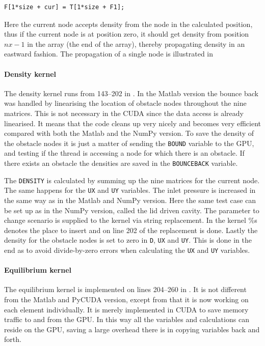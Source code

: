 \begin{verbatim}
F[1*size + cur] = T[1*size + F1];
\end{verbatim}

Here the current node accepts density from the node in the calculated position, thus if the current node is at position zero, it should get density from position $nx-1$ in the array (the end of the array), thereby propagating density in an eastward fashion. The propagation of a single node is illustrated in 


\paragraph{Density kernel}
The density kernel runs from 143--202 in . In the Matlab version the bounce back was handled by linearising the location of obstacle nodes throughout the nine matrices. This is not necessary in the CUDA since the data access is already linearised. It means that the code cleans up very nicely and becomes very efficient compared with both the Matlab and the NumPy version. To save the density of the obstacle nodes it is just a matter of sending the \texttt{BOUND} variable to the GPU, and testing if the thread is accessing a node for which there is an obstacle. If there exists an obstacle the densities are saved in the \texttt{BOUNCEBACK} variable.

The \texttt{DENSITY} is calculated by summing up the nine matrices for the current node. The same happens for the \texttt{UX} and \texttt{UY} variables. The inlet pressure is increased in the same way as in the Matlab and NumPy version. Here the same test case can be set up as in the NumPy version, called the lid driven cavity. The parameter to change scenario is supplied to the kernel via string replacement. In the kernel \%s denotes the place to insert and on line 202 of  the replacement is done. Lastly the density for the obstacle nodes is set to zero in \texttt{D}, \texttt{UX} and \texttt{UY}. This is done in the end as to avoid divide-by-zero errors when calculating the \texttt{UX} and \texttt{UY} variables.


\paragraph{Equilibrium kernel}
The equilibrium kernel is implemented on lines 204--260 in . It is not different from the Matlab and PyCUDA version, except from that it is now working on each element individually. It is merely implemented in CUDA to save memory traffic to and from the GPU. In this way all the variables and calculations can reside on the GPU, saving a large overhead there is in copying variables back and forth.

